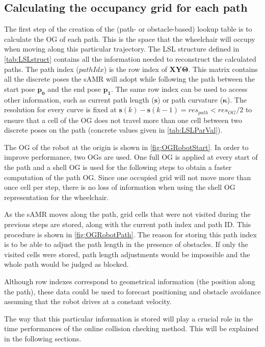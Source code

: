 \subsection{Calculating the occupancy grid for each path} \label{sec:OGC}
The first step of the creation of the (path- or obstacle-based) lookup table is to calculate the OG of each path. This is the space that the wheelchair will occupy when moving along this particular trajectory. The LSL structure defined in \cref{tab:LSLstruct} contains all the information needed to reconstruct the calculated paths. The path index ($pathIdx$) is the row index of $\bm{XY\Theta}$. This matrix contains all the discrete poses the sAMR will adopt while following the path between the start pose $\bm{p_0}$ and the end pose $ \bm{p_1}$. The same row index can be used to access other information, such as current path length ($\bm{s}$) or path curvature ($\bm{\kappa}$). The resolution for every curve is fixed at $\bm{s}(k) - \bm{s}(k-1) = res_{path} < res_{OG}/2$ to ensure that a cell of the OG does not travel more than one cell between two discrete poses on the path (concrete values given in \cref{tab:LSLParVal}).

The OG of the robot at the origin is shown in \cref{fig:OGRobotStart}. In order to improve performance, two OGs are used. One full OG is applied at every start of the path and a shell OG is used for the following steps to obtain a faster computation of the path OG. Since one occupied grid will not move more than once cell per step, there is no loss of information when using the shell OG representation for the wheelchair.

As the sAMR moves along the path, grid cells that were not visited during the previous steps are stored, along with the current path index and path ID. This procedure is shown in \cref{fig:OGRobotPath}. The reason for storing this path index is to be able to adjust the path length in the presence of obstacles. If only the visited cells were stored, path length adjustments would be impossible and the whole path would be judged as blocked.

Although row indexes correspond to geometrical information (the position along the path), these data could be used to forecast positioning and obstacle avoidance assuming that the robot drives at a constant velocity. 

The way that this particular information is stored will play a crucial role in the time performances of the online collision checking method. This will be explained in the following sections.

